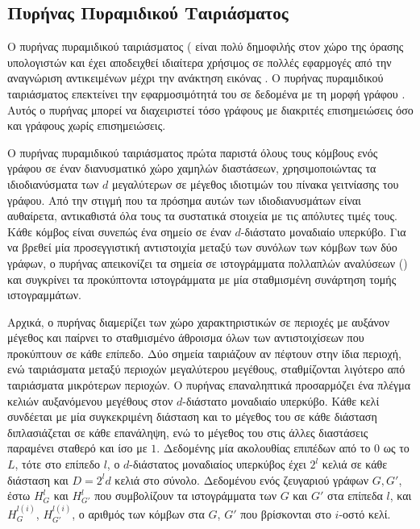 \subsection{Πυρήνας Πυραμιδικού Ταιριάσματος}
\label{ssec:pm}
Ο πυρήνας πυραμιδικού ταιριάσματος ( είναι πολύ δημοφιλής στον χώρο της όρασης υπολογιστών και έχει αποδειχθεί ιδιαίτερα χρήσιμος σε πολλές εφαρμογές από την αναγνώριση αντικειμένων μέχρι την ανάκτηση εικόνας \cite{grauman2007pyramid,lazebnik2006beyond}.
Ο πυρήνας πυραμιδικού ταιριάσματος επεκτείνει την εφαρμοσιμότητά του σε δεδομένα με τη μορφή γράφου \cite{nikolentzos2017matching}.
Αυτός ο πυρήνας μπορεί να διαχειριστεί τόσο γράφους με διακριτές επισημειώσεις όσο και γράφους χωρίς επισημειώσεις.\par
Ο πυρήνας πυραμιδικού ταιριάσματος πρώτα παριστά όλους τους κόμβους ενός γράφου σε έναν διανυσματικό χώρο χαμηλών διαστάσεων, χρησιμοποιώντας τα ιδιοδιανύσματα των $d$ μεγαλύτερων σε μέγεθος ιδιοτιμών του πίνακα γειτνίασης του γράφου.
Από την στιγμή που τα πρόσημα αυτών των ιδιοδιανυσμάτων είναι αυθαίρετα, αντικαθιστά όλα τους τα συστατικά στοιχεία με τις απόλυτες τιμές τους.
Κάθε κόμβος είναι συνεπώς ένα σημείο σε έναν $d$-διάστατο μοναδιαίο υπερκύβο.
Για να βρεθεί μία προσεγγιστική αντιστοιχία μεταξύ των συνόλων των κόμβων των δύο γράφων, ο πυρήνας απεικονίζει τα σημεία σε ιστογράμματα πολλαπλών αναλύσεων () και συγκρίνει τα προκύπτοντα ιστογράμματα με μία σταθμισμένη συνάρτηση τομής ιστογραμμάτων.\par
Αρχικά, ο πυρήνας διαμερίζει των χώρο χαρακτηριστικών σε περιοχές με αυξάνον μέγεθος και παίρνει το σταθμισμένο άθροισμα όλων των αντιστοιχίσεων που προκύπτουν σε κάθε επίπεδο.
Δύο σημεία ταιριάζουν αν πέφτουν στην ίδια περιοχή, ενώ ταιριάσματα μεταξύ περιοχών μεγαλύτερου μεγέθους, σταθμίζονται λιγότερο από ταιριάσματα μικρότερων περιοχών.
Ο πυρήνας επαναληπτικά προσαρμόζει ένα πλέγμα κελιών αυξανόμενου μεγέθους στον $d$-διάστατο μοναδιαίο υπερκύβο.
Κάθε κελί συνδέεται με μία συγκεκριμένη διάσταση και το μέγεθος του σε κάθε διάσταση διπλασιάζεται σε κάθε επανάληψη, ενώ το μέγεθος του στις άλλες διαστάσεις παραμένει σταθερό και ίσο με $1$.
Δεδομένης μία ακολουθίας επιπέδων από το $0$ ως το $L$, τότε στο επίπεδο $l$, ο $d$-διάστατος μοναδιαίος υπερκύβος έχει $2^l$ κελιά σε κάθε διάσταση και $D = 2^{l}d$ κελιά στο σύνολο.
Δεδομένου ενός ζευγαριού γράφων $G,G'$, έστω $H_{G}^{l}$ και $H_{G'}^{l}$ που συμβολίζουν τα ιστογράμματα των $G$ και $G'$ στα επίπεδα $l$, και $H_{G}^{l(i)}$, $H_{G'}^{l(i)}$, ο αριθμός των κόμβων στα $G$, $G'$ που βρίσκονται στο $i$-οστό κελί.
